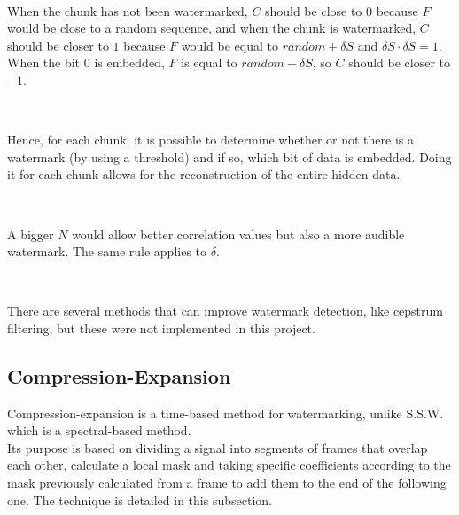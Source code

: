~

When the chunk has not been watermarked, $C$ should be close to $0$ because $F$ would be close to a random sequence, and when the chunk is watermarked, $C$ should be closer to $1$ because $F$ would be equal to $random + \delta S$ and $\delta S \cdot \delta S = 1$. When the bit 0 is embedded, $F$ is equal to $random - \delta S$, so $C$ should be closer to $-1$.

~

Hence, for each chunk, it is possible to determine whether or not there is a watermark (by using a threshold) and if so, which bit of data is embedded. Doing it for each chunk allows for the reconstruction of the entire hidden data.

~

A bigger $N$ would allow better correlation values but also a more audible watermark. The same rule applies to $\delta$.

~

There are several methods that can improve watermark detection, like cepstrum filtering, but these were not implemented in this project.

\subsection{Compression-Expansion}

Compression-expansion is a time-based method for watermarking, unlike S.S.W. which is a spectral-based method.\\
Its purpose is based on dividing a signal into segments of frames that overlap each other, calculate a local mask and taking specific coefficients according to the mask previously calculated from a frame to add them to the end of the following one. The technique is detailed in this subsection.


